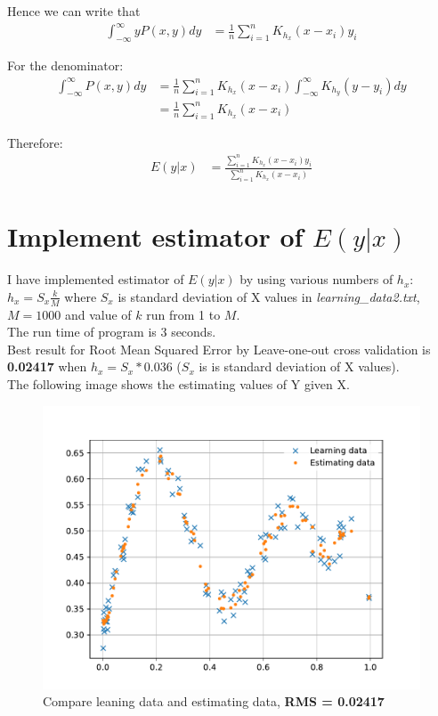 \documentclass[11pt]{article}
\begin{document}
Hence we can write that 
\begin{equation*}
\begin{split}
\int_{-\infty}^{\infty}yP(x,y)dy &= \frac{1}{n} \sum_{i=1}^{n} K_{h_x}(x-x_i) y_i
\end{split}
\end{equation*}




For the denominator:
\begin{equation*}
\begin{split}
\int_{-\infty}^{\infty}P(x,y)dy &= \frac{1}{n} \sum_{i=1}^{n} K_{h_x}(x-x_i) \int_{-\infty}^{\infty}K_{h_y}(y-y_i)dy \\
&= \frac{1}{n} \sum_{i=1}^{n} K_{h_x}(x-x_i)
\end{split}
\end{equation*}


Therefore:
\begin{equation*}
\begin{split}
E(y|x) &= \frac{\sum_{i=1}^{n}K_{h_x}(x-x_i) y_i}{\sum_{i=1}^{n}K_{h_x}(x-x_i)}
\end{split}
\end{equation*}





\section{Implement estimator of $E(y|x)$}
I have implemented estimator of $E(y|x)$ by using various numbers of $h_x$: $h_x = S_x \frac{k}{M}$ where $S_x$ is standard deviation of X values in \textit{learning\_data2.txt}, $M = 1000$ and value of $k$ run from 1 to $M$. \\
The run time of program is 3 seconds. \\
Best result for Root Mean Squared Error by Leave-one-out cross validation is \textbf{0.02417} when $h_x = S_x * 0.036$ ($S_x$ is is standard deviation of X values).\\
The following image shows the estimating values of Y given X.

\begin{figure}[!ht]
	\centering
	\includegraphics[scale=1.0]{figure.pdf}	
	\caption[29]{Compare leaning data and estimating data, \textbf{RMS = 0.02417}}
\end{figure}
\end{document}
